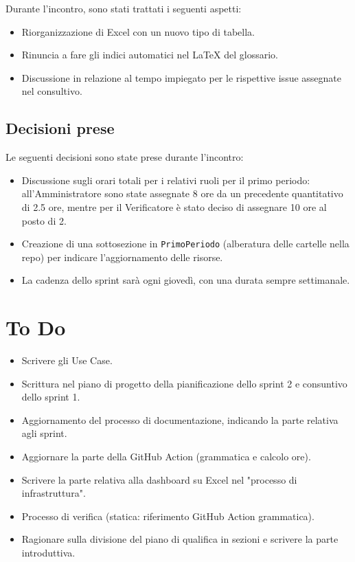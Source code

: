 \documentclass[a4paper, 12pt]{article}
\begin{document}
Durante l'incontro, sono stati trattati i seguenti aspetti:
\begin{itemize}
    \item Riorganizzazione di Excel con un nuovo tipo di tabella.
    \item Rinuncia a fare gli indici automatici nel LaTeX del glossario.
    \item Discussione in relazione al tempo impiegato per le rispettive issue assegnate nel consultivo.
\end{itemize}

\subsection{Decisioni prese}

Le seguenti decisioni sono state prese durante l'incontro:
\begin{itemize}
    \item Discussione sugli orari totali per i relativi ruoli per il primo periodo: 
    all'Amministratore sono state assegnate 8 ore da un precedente quantitativo di 2.5 ore, mentre per il Verificatore è stato deciso di assegnare 10 ore al posto di 2.
    \item Creazione di una sottosezione in \texttt{PrimoPeriodo} (alberatura delle cartelle nella repo) per indicare l'aggiornamento delle risorse.
    \item La cadenza dello sprint sarà ogni giovedì, con una durata sempre settimanale.
\end{itemize}

\section{To Do}
\begin{itemize}
    \item Scrivere gli Use Case.
    \item Scrittura nel piano di progetto della pianificazione dello sprint 2 e consuntivo dello sprint 1.
    \item Aggiornamento del processo di documentazione, indicando la parte relativa agli sprint.
    \item Aggiornare la parte della GitHub Action (grammatica e calcolo ore).
    \item Scrivere la parte relativa alla dashboard su Excel nel "processo di infrastruttura".
    \item Processo di verifica (statica: riferimento GitHub Action grammatica).
    \item Ragionare sulla divisione del piano di qualifica in sezioni e scrivere la parte introduttiva.
\end{itemize}
\end{document}
